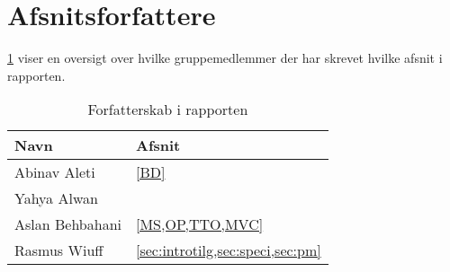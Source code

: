 \appendix
\appendixpage
\addappheadtotoc
\section{Afsnitsforfattere}\label{sec:arbejde}
\cref{tbl:arbejde} viser en oversigt over hvilke gruppemedlemmer der har skrevet hvilke afsnit i rapporten.
\begin{table}[H]
    \centering
    \caption{Forfatterskab i rapporten}\label{tbl:arbejde}
    \begin{tabular}{p{}p{}}
        \toprule
        Navn            & Afsnit                                \\
        \midrule
        Abinav Aleti    &   \cref{BD}                            \\
        \midrule
        Yahya Alwan     &                                       \\
        \midrule
        Aslan Behbahani & \cref{MS,OP,TTO,MVC}                  \\
        \midrule
        Rasmus Wiuff    & \cref{sec:introtilg,sec:speci,sec:pm} \\
        \bottomrule
    \end{tabular}
\end{table}